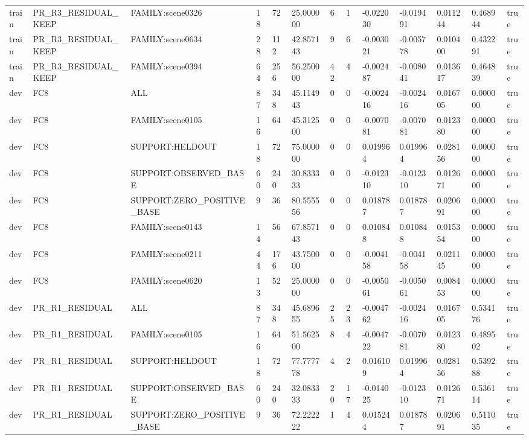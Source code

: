 \begin{tabular}{lllllllllllll}
train & PR\_R3\_RESIDUAL\_KEEP & FAMILY:scene0326 & 18 & 72 & 25.000000 & 6 & 1 & -0.022030 & -0.019491 & 0.011244 & 0.468944 & true \\
train & PR\_R3\_RESIDUAL\_KEEP & FAMILY:scene0634 & 28 & 112 & 42.857143 & 9 & 6 & -0.003021 & -0.005778 & 0.010400 & 0.432291 & true \\
train & PR\_R3\_RESIDUAL\_KEEP & FAMILY:scene0394 & 64 & 256 & 56.250000 & 42 & 4 & -0.002487 & -0.008041 & 0.013617 & 0.464839 & true \\
dev & FC8 & ALL & 87 & 348 & 45.114943 & 0 & 0 & -0.002416 & -0.002416 & 0.016705 & 0.000000 & true \\
dev & FC8 & FAMILY:scene0105 & 16 & 64 & 45.312500 & 0 & 0 & -0.007081 & -0.007081 & 0.012380 & 0.000000 & true \\
dev & FC8 & SUPPORT:HELDOUT & 18 & 72 & 75.000000 & 0 & 0 & 0.019964 & 0.019964 & 0.028156 & 0.000000 & true \\
dev & FC8 & SUPPORT:OBSERVED\_BASE & 60 & 240 & 30.833333 & 0 & 0 & -0.012310 & -0.012310 & 0.012671 & 0.000000 & true \\
dev & FC8 & SUPPORT:ZERO\_POSITIVE\_BASE & 9 & 36 & 80.555556 & 0 & 0 & 0.018787 & 0.018787 & 0.020691 & 0.000000 & true \\
dev & FC8 & FAMILY:scene0143 & 14 & 56 & 67.857143 & 0 & 0 & 0.010848 & 0.010848 & 0.015354 & 0.000000 & true \\
dev & FC8 & FAMILY:scene0211 & 44 & 176 & 43.750000 & 0 & 0 & -0.004158 & -0.004158 & 0.021145 & 0.000000 & true \\
dev & FC8 & FAMILY:scene0620 & 13 & 52 & 25.000000 & 0 & 0 & -0.005061 & -0.005061 & 0.008453 & 0.000000 & true \\
dev & PR\_R1\_RESIDUAL & ALL & 87 & 348 & 45.689655 & 25 & 23 & -0.004762 & -0.002416 & 0.016705 & 0.534176 & true \\
dev & PR\_R1\_RESIDUAL & FAMILY:scene0105 & 16 & 64 & 51.562500 & 8 & 4 & -0.004722 & -0.007081 & 0.012380 & 0.489502 & true \\
dev & PR\_R1\_RESIDUAL & SUPPORT:HELDOUT & 18 & 72 & 77.777778 & 4 & 2 & 0.016109 & 0.019964 & 0.028156 & 0.539288 & true \\
dev & PR\_R1\_RESIDUAL & SUPPORT:OBSERVED\_BASE & 60 & 240 & 32.083333 & 20 & 17 & -0.014025 & -0.012310 & 0.012671 & 0.536114 & true \\
dev & PR\_R1\_RESIDUAL & SUPPORT:ZERO\_POSITIVE\_BASE & 9 & 36 & 72.222222 & 1 & 4 & 0.015244 & 0.018787 & 0.020691 & 0.511035 & true \\

\end{tabular}
